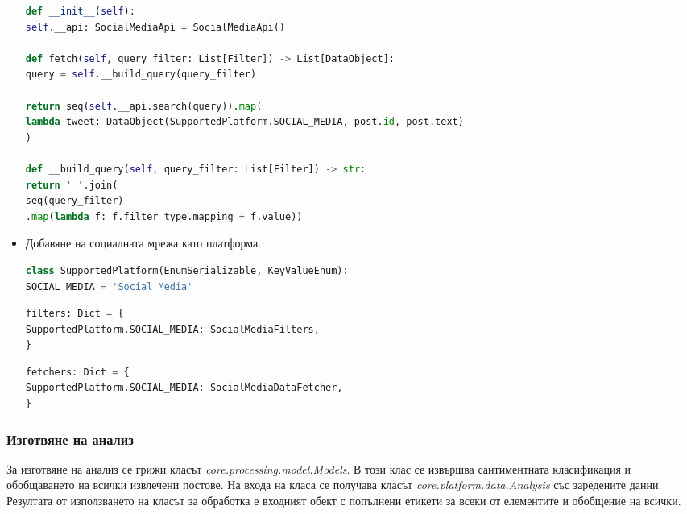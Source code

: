 \documentclass{article}
\begin{document}
\begin{itemize}
\begin{lstlisting}[language=Python, caption=Дефиниция на извличането на данни от новата социална мрежа.]
def __init__(self):
self.__api: SocialMediaApi = SocialMediaApi()

def fetch(self, query_filter: List[Filter]) -> List[DataObject]:
query = self.__build_query(query_filter)

return seq(self.__api.search(query)).map(
lambda tweet: DataObject(SupportedPlatform.SOCIAL_MEDIA, post.id, post.text)
)

def __build_query(self, query_filter: List[Filter]) -> str:
return ' '.join(
seq(query_filter)
.map(lambda f: f.filter_type.mapping + f.value))
\end{lstlisting}

\item Добавяне на социалната мрежа като платформа.

\begin{lstlisting}[language=Python, caption=Дефиниране на нова платформа за социална мрежа в \textit{core.platform. supported\_platforms.SupportedPlatform}.]
class SupportedPlatform(EnumSerializable, KeyValueEnum):
SOCIAL_MEDIA = 'Social Media'
\end{lstlisting}

\begin{lstlisting}[language=Python, caption=Дефиниране на филтър за социалната мрежа в \textit{core.platform.platform\_facade.filters}.]
filters: Dict = {
SupportedPlatform.SOCIAL_MEDIA: SocialMediaFilters,
}
\end{lstlisting}

\begin{lstlisting}[language=Python, caption=Дефиниране на клас за извличане на данни от социалната мрежа в \textit{core.platform.platform\_facade.fetchers}.]
fetchers: Dict = {
SupportedPlatform.SOCIAL_MEDIA: SocialMediaDataFetcher,
}
\end{lstlisting}

\end{itemize}

\subsubsection{Изготвяне на анализ}

За изготвяне на анализ се грижи класът \textit{core.processing.model.Models}. В този клас се извършва сантиментната
класификация и обобщаването на всички извлечени постове. На входа на класа се получава класът
\textit{core.platform.data.Analysis} със заредените данни. Резултата от използването на класът за обработка е входният
обект с попълнени етикети за всеки от елементите и обобщение на всички.
\end{document}
